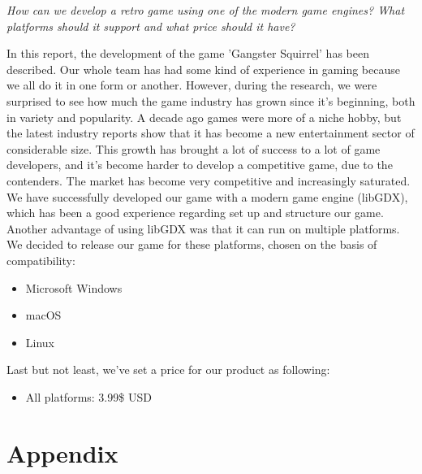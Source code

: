 \documentclass[12p]{article}
\begin{document}
\textit{How can we develop a retro game using one of the modern game engines? What platforms should it support and what price should it have?}

In this report, the development of the game 'Gangster Squirrel' has been described.
Our whole team has had some kind of experience in gaming because we all do it in one form or another. However, during the research, we were surprised to see how much the game industry has grown since it's beginning, both in variety and popularity. A decade ago games were more of a niche hobby, but the latest industry reports show that it has become a new entertainment sector of considerable size.
This growth has brought a lot of success to a lot of game developers, and it's become harder to develop a competitive game, due to the contenders. The market has become very competitive and increasingly saturated. We have successfully developed our game with a modern game engine (libGDX), which has been a good experience regarding set up and structure our game. Another advantage of using libGDX was that it can run on multiple platforms. We decided to release our game for these platforms, chosen on the basis of compatibility:

\begin{itemize}
    \item Microsoft Windows
    \item macOS
    \item Linux
\end{itemize}

Last but not least, we've set a price for our product as following: 

\begin{itemize}
  \item All platforms: 3.99\$ USD
\end{itemize}


\newpage
\printbibliography[heading=bibintoc,title={References}]


\newpage
\appendix

\section{Appendix}
\end{document}
